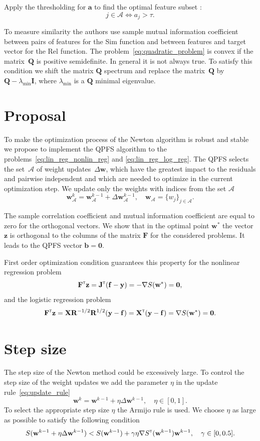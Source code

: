 \documentclass[a4paper,12pt]{article}
\theoremstyle{plain} %
\theoremstyle{definition} %
\theoremstyle{remark} %
\newcommand{\ba}{\mathbf{a}}
\newcommand{\bb}{\mathbf{b}}
\newcommand{\bw}{\mathbf{w}}
\newcommand{\by}{\mathbf{y}}
\newcommand{\bz}{\mathbf{z}}
\newcommand{\cA}{\mathcal{A}}
\newcommand{\bJ}{\mathbf{J}}
\newcommand{\bQ}{\mathbf{Q}}
\newcommand{\bF}{\mathbf{F}}
\newcommand{\bR}{\mathbf{R}}
\newcommand{\bX}{\mathbf{X}}
\newcommand{\T}{{\text{\tiny\sffamily\upshape\mdseries T}}}
\begin{document}
  	Apply the thresholding for $\ba$ to find the optimal feature subset :
  	\[
  		j \in \mathcal{A} \Leftrightarrow a_j > \tau.
  	\]
  	
  	To measure similarity the authors use sample mutual information coefficient between pairs of features for the Sim function and between features and target vector for the Rel function.
  	The problem~\eqref{eq:quadratic_problem} is convex if the matrix~$\bQ$ is positive semidefinite. In general it is not always true. 
  	To satisfy this condition we shift the matrix $\bQ$ spectrum and replace the matrix~$\bQ$ by $\bQ - \lambda_{\text{min}} \mathbf{I}$, where $\lambda_{\text{min}} $ is a $\bQ$ minimal eigenvalue.
  	
  	\section*{Proposal}
  	
  	To make the optimization process of the Newton algorithm is robust and stable we propose to implement the QPFS algorithm to the problems~\eqref{eq:lin_reg_nonlin_reg} and \eqref{eq:lin_reg_log_reg}. 
  	The QPFS selects the set~$\cA$ of weight updates~$\Delta \bw$, which have the greatest impact to the residuals and pairwise independent and which are needed to optimize in the current optimization step. 
  	We update only the weights with indices from the set $\cA$
  	\[
  		\bw_{\cA}^k = \bw_{\cA}^{k - 1} + \Delta \bw_{\cA}^{k - 1}, \quad \bw_{\cA} = \{w_j\}_{j \in \cA}.
  	\]
  	
  	The sample correlation coefficient and mutual information coefficient are equal to zero for the orthogonal vectors.
  	We show that in the optimal point $\bw^*$ the vector $\bz$ is orthogonal to the columns of the matrix $\bF$ for the considered problems. It leads to the QPFS vector $\bb = \boldsymbol{0}$.
  	
	First order optimization condition guarantees this property for the nonlinear regression problem
	\[
		\bF^{\T} \bz = \bJ^{\T} (\mathbf{f} - \by) = - \nabla S(\bw^*) = \boldsymbol{0},
	\]
	and the logistic regression problem
	\[
		\bF^{\T} \bz = \bX \bR^{-1/2} \bR^{1/2} (\by - \mathbf{f}) = \bX^{\T} (\by - \mathbf{f}) = \nabla S(\bw^*) = \boldsymbol{0}.
	\]

	\section*{Step size}
	
	The step size of the Newton method could be excessively large. To control the step size of the weight updates we add the parameter $\eta$ in the update rule~\eqref{eq:update_rule}
	\[
		\bw^k = \bw^{k - 1} + \eta \Delta \bw^{k - 1}, \quad \eta \in [0, 1].
	\]
	To select the appropriate step size $\eta$ the Armijo rule is used. We choose $\eta$ as large as possible to satisfy the following condition
	\[
		S(\bw^{k - 1} + \eta \Delta \bw^{k - 1}) < S(\bw^{k - 1}) + \gamma \eta \nabla S^{\T}(\bw^{k-1})\bw^{k - 1}, \quad \gamma \in [0, 0.5].
	\]
	
\end{document}
